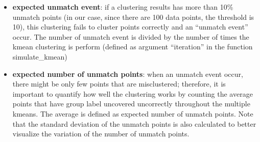 \documentclass[]{article}
\providecommand{\tightlist}{%
  \setlength{\itemsep}{0pt}\setlength{\parskip}{0pt}}
\begin{document}
\begin{itemize}
\tightlist
\item
  \textbf{expected unmatch event}: if a clustering results has more than
  10\% unmatch points (in our case, since there are 100 data points, the
  threshold is 10), this clustering fails to cluster points correctly
  and an ``unmatch event'' occur. The number of unmatch event is divided
  by the number of times the kmean clustering is perform (defined as
  argument ``iteration'' in the function simulate\_kmean)
\item
  \textbf{expected number of unmatch points}: when an unmatch event
  occur, there might be only few points that are misclustered;
  therefore, it is important to quantify how well the clustering works
  by counting the average points that have group label uncovered
  uncorrectly throughout the multiple kmeans. The average is defined as
  expected number of unmatch points. Note that the standard deviation of
  the unmatch points is also calculated to better visualize the
  variation of the number of unmatch points.
\end{itemize}
\end{document}
